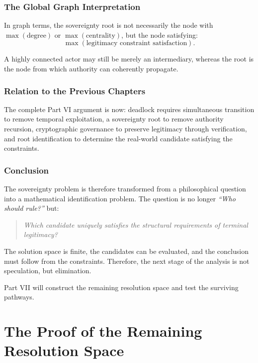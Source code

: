 \documentclass[11pt,openany]{book}
\theoremstyle{plain}
\theoremstyle{definition}
\begin{document}
\section*{The Global Graph Interpretation}

In graph terms, the sovereignty root is not necessarily the node with \(\max(\text{degree})\) or \(\max(\text{centrality})\), but the node satisfying:
\[
\max(\text{legitimacy constraint satisfaction}).
\]

A highly connected actor may still be merely an intermediary, whereas the root is the node from which authority can coherently propagate.

\section*{Relation to the Previous Chapters}

The complete Part VI argument is now: deadlock requires simultaneous transition to remove temporal exploitation, a sovereignty root to remove authority recursion, cryptographic governance to preserve legitimacy through verification, and root identification to determine the real-world candidate satisfying the constraints.

\section*{Conclusion}

The sovereignty problem is therefore transformed from a philosophical question into a mathematical identification problem. The question is no longer \textit{``Who should rule?''} but:
\begin{quote}
\textit{Which candidate uniquely satisfies the structural requirements of terminal legitimacy?}
\end{quote}

The solution space is finite, the candidates can be evaluated, and the conclusion must follow from the constraints. Therefore, the next stage of the analysis is not speculation, but elimination. 

Part VII will construct the remaining resolution space and test the surviving pathways.







\part{The Proof of the Remaining Resolution Space}
\end{document}
